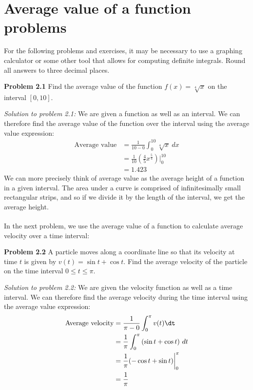 \documentclass[11pt]{scrartcl}
\begin{document}
\section{Average value of a function problems}
\noindent 
For the following problems and exercises, it may be necessary to use a graphing calculator or some other tool that allows for computing definite integrals. Round all answers to three decimal places. 
\begin{tcolorbox}[colback=purple!5!white,colframe=purple!75!black]
\textbf{Problem 2.1} Find the average value of the function $f(x)= \sqrt[4]{x}$ on the interval $[0,10]$.
\end{tcolorbox}
\noindent
\textit{Solution to problem 2.1:} We are given a function as well as an interval. We can therefore find the average value of the function over the interval using the average value expression: 
\begin{align*}
    \text{Average value} &=\frac{1}{10-0}\int_{0}^{10} \sqrt[4]{x} \ dx \\
    &=\frac{1}{10}\left(\frac{4}{5}x^{\frac{5}{4}}\right)\biggr \rvert_0^{10} \\
    &=1.423
\end{align*}
\noindent 
We can more precisely think of average value as the average height of a function in a given interval. The area under a curve is comprised of infinitesimally small rectangular strips, and so if we divide it by the length of the interval, we get the average height. \\
\\
\noindent
In the next problem, we use the average value of a function to calculate average velocity over a time interval:
\begin{tcolorbox}[colback=purple!5!white,colframe=purple!75!black]
\textbf{Problem 2.2} A particle moves along a coordinate line so that its velocity at time $t$ is given by $v(t)=\sin t + \cos t$. Find the average velocity of the particle on the time interval $0\leq t\leq \pi$.
\end{tcolorbox}
\noindent 
\textit{Solution to problem 2.2:} We are given the velocity function as well as a time interval. We can therefore find the average velocity during the time interval using the average value expression: 
\begin{align*}
    \text{Average velocity} &=\frac{1}{\pi -0}\int_{0}^{\pi}{v(t) \dt} \\
                            &=\frac{1}{\pi}\int_{0}^{\pi}{(\sin t + \cos t) \ dt} \\
                        &=\frac{1}{\pi}(-\cos t +\sin t)\biggr \rvert_0^\pi  \\
                        &=\frac{1}{\pi}
\end{align*}
\end{document}
